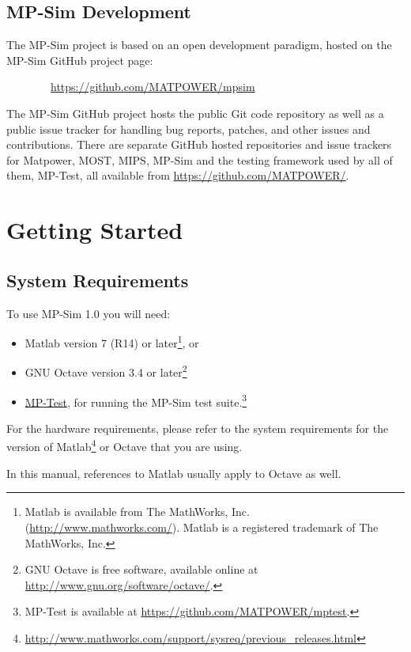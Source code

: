 \documentclass[12pt]{article}
\newcommand{\matlab}[0]{{\sc Matlab}}
\newcommand{\matpower}[0]{{\sc Matpower}}
\newcommand{\mptest}[0]{{MP-Test}}
\newcommand{\mptesturl}[0]{https://github.com/MATPOWER/mptest}
\newcommand{\mptestlink}[0]{\href{\mptesturl}{\mptest{}}}
\newcommand{\mips}[0]{{MIPS}}
\newcommand{\mpsim}[0]{{MP-Sim}}
\newcommand{\mpsimver}[0]{1.0}
\newcommand{\mpsimurl}[0]{https://github.com/MATPOWER/mpsim}
\newcommand{\most}[0]{{MOST}}
\numberwithin{equation}{section}
\numberwithin{table}{section}
\numberwithin{figure}{section}
\begin{document}
\subsection{\mpsim{} Development}
\label{sec:development}

The \mpsim{} project is based on an open development paradigm, hosted on the \mpsim{} GitHub project page:

\bigskip

~~~~~~~~\url{\mpsimurl}

\bigskip

The \mpsim{} GitHub project hosts the public Git code repository as well as a public issue tracker for handling bug reports, patches, and other issues and contributions. There are separate GitHub hosted repositories and issue trackers for \matpower{}, \most{}, \mips{}, \mpsim{} and the testing framework used by all of them, \mptest{}, all available from \url{https://github.com/MATPOWER/}.


\section{Getting Started}

\subsection{System Requirements}
\label{sec:sysreq}
To use \mpsim{} \mpsimver{} you will need:
\begin{itemize}
\item \matlab{}\textsuperscript{\tiny \textregistered} version 7 (R14) or later\footnote{\matlab{} is available from The MathWorks, Inc. (\url{http://www.mathworks.com/}). \matlab{} is a registered trademark of The MathWorks, Inc.}, or
\item GNU Octave version 3.4 or later\footnote{GNU Octave \cite{octave} is free software, available online at \url{http://www.gnu.org/software/octave/}.}
\item \mptestlink{}, for running the \mpsim{} test suite.\footnote{\mptest{} is available at \url{\mptesturl}.}
\end{itemize}

For the hardware requirements, please refer to the system requirements for the version of \matlab{}\footnote{\url{http://www.mathworks.com/support/sysreq/previous_releases.html}} or Octave that you are using.

In this manual, references to \matlab{} usually apply to Octave as well.
\end{document}
